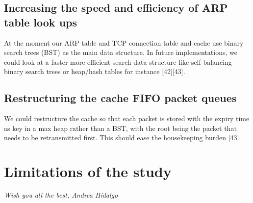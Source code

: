 \documentclass{uathesis}
\begin{document}
 \subsection{Increasing the speed and efficiency of ARP table look ups}
At the moment our ARP table and TCP connection table and cache use binary search trees (BST) as the main data structure. In future implementations, we could look at a faster more efficient search data structure like self balancing binary search trees or heap/hash tables for instance [42][43]. \\

\subsection{Restructuring the cache FIFO packet queues}
We could restructure the cache so that each packet is stored with the expiry time as key in a max heap rather than a BST, with the root being the packet that needs to be retransmitted first. This should ease the housekeeping burden [43].

\section{Limitations of the study}

\vfill
\textit{Wish you all the best, Andrea Hidalgo}
\end{document}
